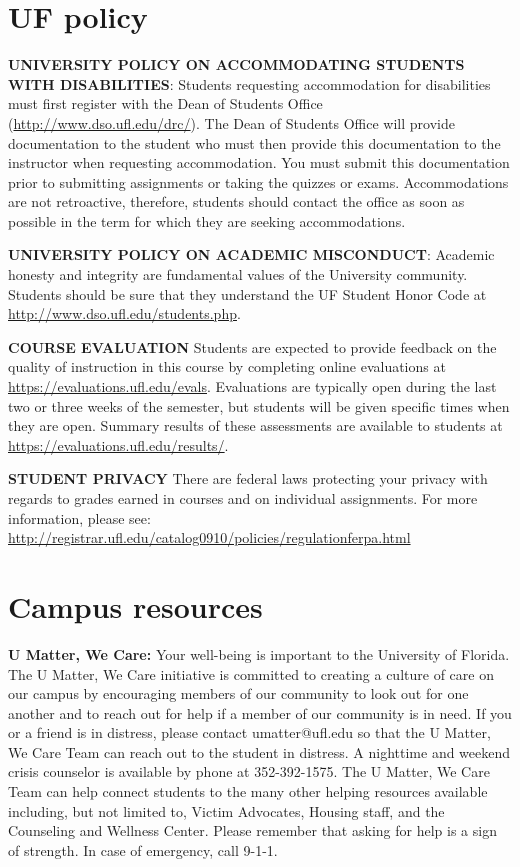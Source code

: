 \documentclass{article}
\begin{document}
\section{UF policy}
\textbf{UNIVERSITY POLICY ON ACCOMMODATING STUDENTS WITH DISABILITIES}: Students requesting accommodation for disabilities must first register with the Dean of Students Office (\url{http://www.dso.ufl.edu/drc/}). The Dean of Students Office will provide documentation to the student who must then provide this documentation to the instructor when requesting accommodation. You must submit this documentation prior to submitting assignments or taking the quizzes or exams. Accommodations are not retroactive, therefore, students should contact the office as soon as possible in the term for which they are seeking accommodations. 

\textbf{UNIVERSITY POLICY ON ACADEMIC MISCONDUCT}:  Academic honesty and integrity are fundamental values of the University community. Students should be sure that they understand the UF Student Honor Code at \url{http://www.dso.ufl.edu/students.php}.

\textbf{COURSE EVALUATION}
Students are expected to provide feedback on the quality of instruction in this course by completing online evaluations at \url{https://evaluations.ufl.edu/evals}.  Evaluations are typically open during the last two or three weeks of the semester, but students will be given specific times when they are open. Summary results of these assessments are available to students at \url{https://evaluations.ufl.edu/results/}.

\textbf{STUDENT PRIVACY}
There are federal laws protecting your privacy with regards to grades earned in courses and on individual assignments.  For more information, please see:  \url{http://registrar.ufl.edu/catalog0910/policies/regulationferpa.html}


\section{Campus resources}
\textbf{U Matter, We Care:} 
Your well-being is important to the University of Florida.  The U Matter, We Care initiative is committed to creating a culture of care on our campus by encouraging members of our community to look out for one another and to reach out for help if a member of our community is in need.  If you or a friend is in distress, please contact umatter@ufl.edu so that the U Matter, We Care Team can reach out to the student in distress.  A nighttime and weekend crisis counselor is available by phone at 352-392-1575.  The U Matter, We Care Team can help connect students to the many other helping resources available including, but not limited to, Victim Advocates, Housing staff, and the Counseling and Wellness Center.  Please remember that asking for help is a sign of strength.  In case of emergency, call 9-1-1.
\end{document}
